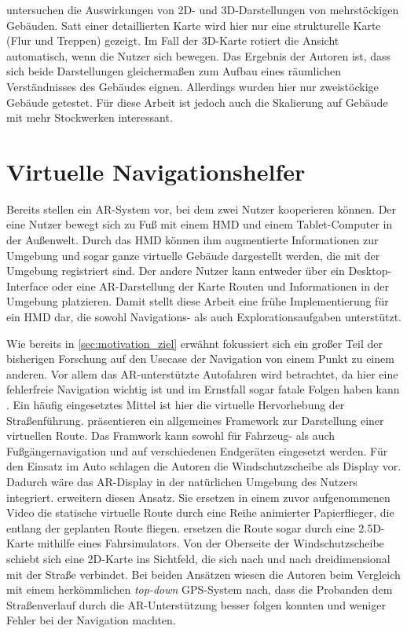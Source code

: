 \textcite{Li2013} untersuchen die Auswirkungen von 2D- und 3D-Dar\-stel\-lun\-gen von mehrstöckigen Gebäuden.
Satt einer detaillierten Karte wird hier nur eine strukturelle Karte (Flur und Treppen) gezeigt.
Im Fall der 3D-Karte rotiert die Ansicht automatisch, wenn die Nutzer sich bewegen.
Das Ergebnis der Autoren ist, dass sich beide Darstellungen gleichermaßen zum Aufbau eines räumlichen Verständnisses des Gebäudes eignen.
Allerdings wurden hier nur zweistöckige Gebäude getestet.
Für diese Arbeit ist jedoch auch die Skalierung auf Gebäude mit mehr Stockwerken interessant.

\section{Virtuelle Navigationshelfer}
Bereits \textcite{Hoellerer1999} stellen ein AR-System vor, bei dem zwei Nutzer kooperieren können.
Der eine Nutzer bewegt sich zu Fuß mit einem HMD und einem Tablet-Computer in der Außenwelt.
Durch das HMD können ihm augmentierte Informationen zur Umgebung und sogar ganze virtuelle Gebäude dargestellt werden, die mit der Umgebung registriert sind.
Der andere Nutzer kann entweder über ein Desktop-Interface oder eine AR-Darstellung der Karte Routen und Informationen in der Umgebung platzieren.
Damit stellt diese Arbeit eine frühe Implementierung für ein HMD dar, die sowohl Navigations- als auch Explorationsaufgaben unterstützt.

Wie bereits in \autoref{sec:motivation_ziel} erwähnt fokussiert sich ein großer Teil der bisherigen Forschung auf den Usecase der Navigation von einem Punkt zu einem anderen.
Vor allem das AR-unterstützte Autofahren wird betrachtet, da hier eine fehlerfreie Navigation wichtig ist und im Ernstfall sogar fatale Folgen haben kann \parencite{Lin2017}.
Ein häufig eingesetztes Mittel ist hier die virtuelle Hervorhebung der Straßenführung.
\textcite{Narzt2006} präsentieren ein allgemeines Framework zur Darstellung einer virtuellen Route.
Das Framwork kann sowohl für Fahrzeug- als auch Fußgängernavigation und auf verschiedenen Endgeräten eingesetzt werden.
Für den Einsatz im Auto schlagen die Autoren die Windschutzscheibe als Display vor.
Dadurch wäre das AR-Display in der natürlichen Umgebung des Nutzers integriert.
\textcite{Bark2014} erweitern diesen Ansatz.
Sie ersetzen in einem zuvor aufgenommenen Video die statische virtuelle Route durch eine Reihe animierter Papierflieger, die entlang der geplanten Route fliegen.
\textcite{Kim2009} ersetzen die Route sogar durch eine 2.5D-Karte mithilfe eines Fahrsimulators.
Von der Oberseite der Windschutzscheibe schiebt sich eine 2D-Karte ins Sichtfeld, die sich nach und nach dreidimensional mit der Straße verbindet.
Bei beiden Ansätzen wiesen die Autoren beim Vergleich mit einem herkömmlichen \emph{top-down} GPS-System nach, dass die Probanden dem Straßenverlauf durch die AR-Unterstützung besser folgen konnten und weniger Fehler bei der Navigation machten.


